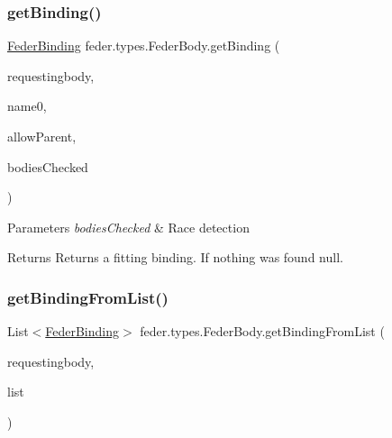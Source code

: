 \subsubsection{\texorpdfstring{get\+Binding()}{getBinding()}\hspace{0.1cm}{\footnotesize\ttfamily [2/2]}}
{\footnotesize\ttfamily \hyperlink{classfeder_1_1types_1_1FederBinding}{Feder\+Binding} feder.\+types.\+Feder\+Body.\+get\+Binding (\begin{DoxyParamCaption}\item[{\hyperlink{classfeder_1_1types_1_1FederBody}{Feder\+Body}}]{requestingbody,  }\item[{String}]{name0,  }\item[{boolean}]{allow\+Parent,  }\item[{List$<$ \hyperlink{classfeder_1_1types_1_1FederBody}{Feder\+Body} $>$}]{bodies\+Checked }\end{DoxyParamCaption})\hspace{0.3cm}{\ttfamily [protected]}}


\begin{DoxyParams}{Parameters}
{\em bodies\+Checked} & Race detection \\
\hline
\end{DoxyParams}
\begin{DoxyReturn}{Returns}
Returns a fitting binding. If nothing was found \textquotesingle{}null\textquotesingle{}. 
\end{DoxyReturn}
\mbox{\label{classfeder_1_1types_1_1FederBody_a119382c9410b28689420735a3863d08f}} 
\subsubsection{\texorpdfstring{get\+Binding\+From\+List()}{getBindingFromList()}}
{\footnotesize\ttfamily List$<$\hyperlink{classfeder_1_1types_1_1FederBinding}{Feder\+Binding}$>$ feder.\+types.\+Feder\+Body.\+get\+Binding\+From\+List (\begin{DoxyParamCaption}\item[{\hyperlink{classfeder_1_1types_1_1FederBody}{Feder\+Body}}]{requestingbody,  }\item[{List$<$ String $>$}]{list }\end{DoxyParamCaption})}


